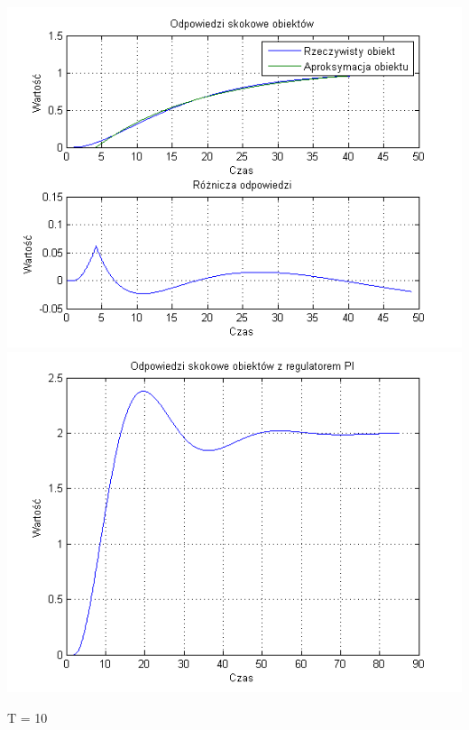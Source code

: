 \documentclass[10pt,a4paper]{article}
\begin{document}
\begin{center}
\includegraphics[scale=1]{images/jeden/skrypt_71.png}\\
\includegraphics[scale=1]{images/jeden/skrypt_72.png}\\
\end{center}
\newpage
T = 10
\end{document}
